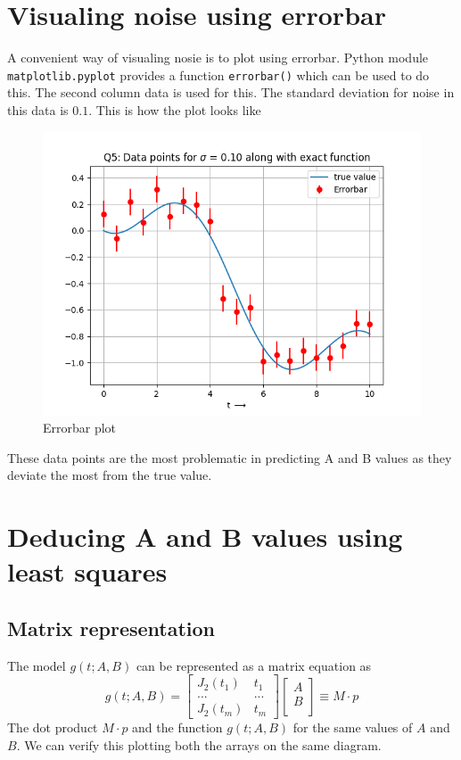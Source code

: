 \documentclass[12pt, a4paper]{report}
\begin{document}
\section*{Visualing noise using errorbar}
 A convenient way of visualing nosie is to plot using errorbar. Python module  \texttt{matplotlib.pyplot} provides a function \texttt{errorbar()} which can be used to do this. The second column data is used for this. The standard deviation for noise in this data is $0.1$. This is how the plot looks like
 \begin{figure}[H]
 \centering
	\includegraphics[scale=0.8]{Figure_2.png}  %
	\caption{Errorbar plot}
	\label{fig2}
 \end{figure}
 These data points are the most problematic in predicting A and B values as they deviate the most from the true value.
 
\section*{Deducing A and B values using least squares}
 \subsection*{Matrix representation}
  The model $g(t;A,B)$ can be represented as a matrix equation as
  \begin{equation*}
  g(t;A,B) = \begin{bmatrix}
  J_2(t_1) & t_1 \\
  ... & ... \\
  J_2(t_m) & t_m
  \end{bmatrix} \begin{bmatrix}
  A \\
  B \\
\end{bmatrix}   \equiv M\cdot  p
  \end{equation*}
  The dot product $M \cdot p$ and the function $g(t;A,B)$ for the same values of $A$ and $B$. We can verify this plotting both the arrays on the same diagram.
  
\end{document}
